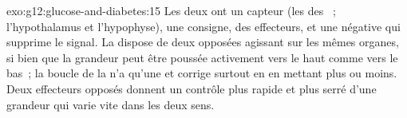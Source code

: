 \begin{solution}{exo:g12:glucose-and-diabetes:15}
Les deux ont un capteur (les  des ~; l'hypothalamus et
l'hypophyse), une consigne, des effecteurs, et une 
négative qui supprime le signal. La  dispose de deux 
opposées agissant sur les mêmes organes, si bien que la grandeur peut
être poussée activement vers le haut comme vers le bas~; la boucle de
la  n'a qu'une  et corrige surtout en en mettant
plus ou moins. Deux effecteurs opposés donnent un contrôle plus rapide
et plus serré d'une grandeur qui varie vite dans les deux sens.
\end{solution}

